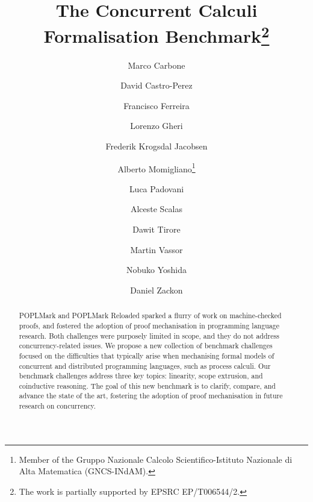 \documentclass[runningheads]{llncs}
\begin{document}
\title{The Concurrent Calculi Formalisation Benchmark\thanks{The work is partially supported by EPSRC EP/T006544/2.}}

\author{
     Marco Carbone 
\and David Castro-Perez 
\and Francisco Ferreira 
\and Lorenzo Gheri 
\and Frederik Krogsdal Jacobsen 
\and Alberto Momigliano\thanks{Member of the Gruppo Nazionale Calcolo Scientifico-Istituto Nazionale di Alta Matematica (GNCS-INdAM).} 
\and Luca Padovani 
\and Alceste Scalas 
\and Dawit Tirore 
\and Martin Vassor 
\and Nobuko Yoshida 
\and Daniel Zackon 
}



\maketitle

\begin{abstract}
  POPLMark and POPLMark Reloaded sparked a flurry of work on
  machine-checked proofs, and fostered the adoption of proof
  mechanisation in programming language research.  Both challenges
  were purposely limited in scope, and they do not address
  concurrency-related issues.  We propose a new collection of
  benchmark challenges focused on the difficulties that typically
  arise when mechanising formal models of concurrent and distributed
  programming languages, such as process calculi.  Our benchmark
  challenges address three key topics: linearity, scope extrusion, and
  coinductive reasoning.  The goal of this new benchmark is to
  clarify, compare, and advance the state of the art, fostering the
  adoption of proof mechanisation in future research on concurrency.

\end{abstract}
\end{document}
